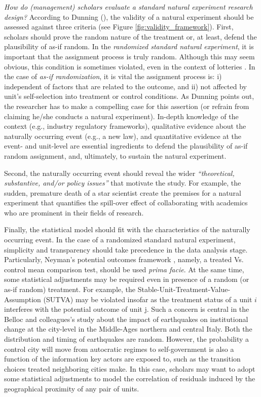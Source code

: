 \emph{How do (management) scholars evaluate a standard natural experiment research
design?} According to Dunning (\cite*[][page 27]{Dunning2012}), the validity of
a natural experiment should be assessed against three criteria (see Figure
\ref{fig:validity_framework}).  First, scholars should prove the random
nature of the treatment or, at least, defend the plausibility of as-if random.
In the \emph{randomized standard natural experiment}, it is
important that the assignment process is truly random. Although this may seem
obvious, this condition is sometimes violated, even in the context of lotteries
\parencite[e.g.,][]{Starr1997}. In the case of \emph{as-if randomization}, it
is vital the assignment process is: i) independent of
factors that are related to the outcome, and ii) not affected by unit's
self-selection into treatment or control conditions. As Dunning points out, the
researcher has to make a compelling case for this assertion (or refrain from
claiming he/she conducts a natural experiment). In-depth knowledge of the context (e.g.,
industry regulatory frameworks), qualitative evidence about the naturally
occurring event (e.g., a new law), and quantitative evidence at the event- and
unit-level are essential ingredients to defend the plausibility of
as-if random assignment, and, ultimately, to sustain the natural experiment.

Second, the naturally occurring event should reveal the wider
\emph{``theoretical, substantive, and/or policy issues''} \parencite[][page
29]{Dunning2012} that motivate the study. For example, the sudden, premature
death of a star scientist \parencite[][]{Azoulay2010} create the premises for a
natural experiment that quantifies the spill-over effect of collaborating with
academics who are prominent in their fields of research.

Finally, the statistical model should fit with the characteristics of the
naturally occurring event. In the case of a randomized standard natural
experiment, simplicity and transparency should take precedence in the data
analysis stage. Particularly, Neyman's potential outcomes framework
\parencite[][]{Splawa1990}, namely, a treated Vs. control mean comparison test,
should be used \emph{prima facie}. At the same time, some statistical
adjustments may be required even in presence of a random (or as-if random)
treatment. For example, the Stable-Unit-Treatment-Value-Assumption (SUTVA) may
be violated insofar as the treatment status of a unit $i$ interferes with the
potential outcome of unit j. Such a concern is central in the Belloc and
colleagues's \parencite*[][]{Belloc2016} study about the impact of earthquakes
on institutional change at the city-level in the Middle-Ages northern and
central Italy. Both the distribution and timing of earthquakes are random.
However, the probability a control city will move from autocratic regimes to
self-government is also a function of the information key actors are exposed to,
such as the transition choices treated neighboring cities make. In this case,
scholars may want to adopt some statistical adjustments to model the correlation
of residuals induced by the geographical proximity of any pair of units.

